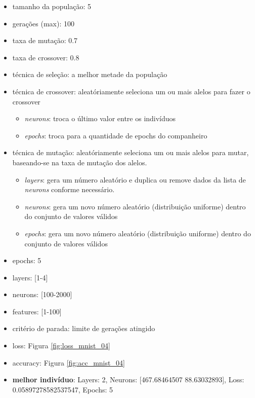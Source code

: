 \documentclass[twoside,conference,a4paper]{IEEEtran}
\begin{document}
\begin{itemize}
    \item tamanho da população: 5
    \item gerações (max): 100
    \item taxa de mutação: 0.7
    \item taxa de crossover: 0.8
    \item técnica de seleção: a melhor metade da população
    \item técnica de crossover: aleatóriamente seleciona um ou mais alelos para fazer o crossover
    \begin{itemize}
        \item \emph{neurons}: troca o último valor entre os indivíduos
        \item \emph{epochs}: troca para a quantidade de epochs do companheiro
    \end{itemize}
    \item técnica de mutação: aleatóriamente seleciona um ou mais alelos para mutar, baseando-se na taxa de mutação dos alelos.
    \begin{itemize}
        \item \emph{layers}: gera um número aleatório e duplica ou remove dados da lista de \emph{neurons} conforme necessário.
        \item \emph{neurons}: gera um novo número aleatório (distribuição uniforme) dentro do conjunto de valores válidos
        \item \emph{epochs}: gera um novo número aleatório (distribuição uniforme) dentro do conjunto de valores válidos
    \end{itemize}
    \item epochs: 5
    \item layers: [1-4]
    \item neurons: [100-2000]
    \item features: [1-100]
    \item critério de parada: limite de gerações atingido
    \item loss: Figura \ref{fig:loss_mnist_04}
    \item accuracy: Figura \ref{fig:acc_mnist_04}
    \item \textbf{melhor indivíduo}: Layers: 2, Neurons: [467.68464507  88.63032893], Loss: 0.05897278582537547, Epochs: 5
\end{itemize}
\end{document}
